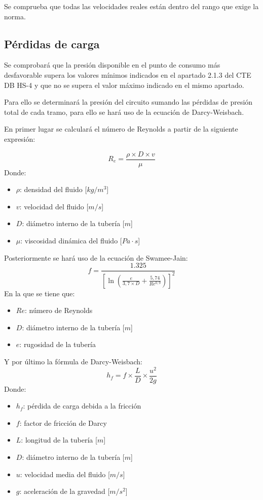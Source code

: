 \documentclass[../main.tex]{subfiles}
\begin{document}
Se comprueba que todas las velocidades reales están dentro del rango que exige la norma.

\subsection{Pérdidas de carga}
Se comprobará que la presión disponible en el punto de consumo más desfavorable supera los valores mínimos indicados en el apartado 2.1.3 del CTE DB HS-4 y que no se supera el valor máximo indicado en el mismo apartado. \par
\vspace{0.5 cm}
Para ello se determinará la presión del circuito sumando las pérdidas de presión total de cada tramo, para ello se hará uso de la ecuación de Darcy-Weisbach. \par
\vspace{0.5 cm}
En primer lugar se calculará el número de Reynolds a partir de la siguiente expresión: \par
\[R_e = \frac{\rho \times D \times v}{\mu}\]
Donde:
\begin{itemize}
    \item $\rho$: densidad del fluido [$kg/m^3$]
    \item $v$: velocidad del fluido [$m/s$]
    \item $D$: diámetro interno de la tubería [$m$]
    \item $\mu$: viscosidad dinámica del fluido [$Pa\cdot s$]
\end{itemize}
\vspace{0.5 cm}
Posteriormente se hará uso de la ecuación de Swamee-Jain:
\[f = \frac{1.325}{[\ln(\frac{e}{3,7 \times D} + \frac{5,74}{Re^{0,9}})]^2}\]
En la que se tiene que:
\begin{itemize}
    \item $Re$: número de Reynolds
    \item $D$: diámetro interno de la tubería [$m$]
    \item $e$: rugosidad de la tubería
\end{itemize}
\vspace{0.5 cm}
Y por último la fórmula de Darcy-Weisbach:
\[h_f = f \times \frac{L}{D} \times \frac{u^2}{2g}\]
Donde:
\begin{itemize}
    \item $h_f$: pérdida de carga debida a la fricción
    \item $f$: factor de fricción de Darcy
    \item $L$: longitud de la tubería [$m$]
    \item $D$: diámetro interno de la tubería [$m$]
    \item $u$: velocidad media del fluido [$m/s$]
    \item $g$: aceleración de la gravedad [$m/s^2$]
\end{itemize}
\end{document}
